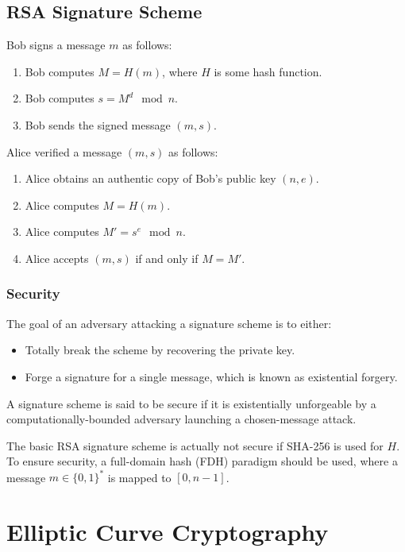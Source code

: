 \documentclass[12pt,titlepage]{article}
\let\stdsection\section
\renewcommand\section{\clearpage\stdsection}
\begin{document}
    \subsection{RSA Signature Scheme}
      Bob signs a message $m$ as follows:
      \begin{enumerate}
        \item Bob computes $M = H(m)$, where $H$ is some hash function.
        \item Bob computes $s = M^d \mod n$.
        \item Bob sends the signed message $(m, s)$.
      \end{enumerate}

      Alice verified a message $(m, s)$ as follows:
      \begin{enumerate}
        \item Alice obtains an authentic copy of Bob's public key $(n,e)$.
        \item Alice computes $M = H(m)$.
        \item Alice computes $M' = s^e \mod n$.
        \item Alice accepts $(m, s)$ if and only if $M = M'$.
      \end{enumerate}

      \subsubsection{Security}
        The goal of an adversary attacking a signature scheme is to either:
        \begin{itemize}
          \item Totally break the scheme by recovering the private key.
          \item Forge a signature for a single message, which is known as existential forgery.
        \end{itemize}

        A signature scheme is said to be secure if it is existentially unforgeable by a
        computationally-bounded adversary launching a chosen-message attack.

        The basic RSA signature scheme is actually not secure if SHA-256 is used for $H$.
        To ensure security, a full-domain hash (FDH) paradigm should be used, where a message
        $m \in \{0, 1\}^*$ is mapped to $[0, n-1]$.

  \section{Elliptic Curve Cryptography}
\end{document}
